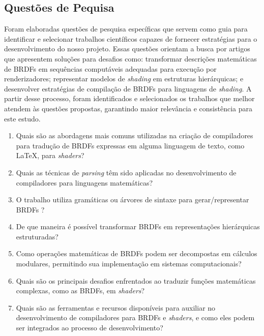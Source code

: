 %
%


%








\subsection{Questões de Pequisa}  \label{questoes-pesquisa}


Foram elaboradas questões de pesquisa específicas que servem como guia para identificar e selecionar trabalhos científicos capazes de fornecer estratégias para o desenvolvimento do nosso projeto. Essas questões orientam a busca por artigos que apresentem soluções para desafios como: transformar descrições matemáticas de BRDFs em sequências computáveis adequadas para execução por renderizadores; representar modelos de \textit{shading} em estruturas hierárquicas; e desenvolver estratégias de compilação de BRDFs para linguagens de \textit{shading}. A partir desse processo, foram identificados e selecionados os trabalhos que melhor atendem às questões propostas, garantindo maior relevância e consistência para este estudo.


\begin{enumerate}
  \item Quais são as abordagens mais comuns utilizadas na criação de compiladores para tradução de BRDFs expressas em alguma linguagem de texto, como \LaTeX{}, para \textit{shaders}?

  \item Quais as técnicas de \textit{parsing} têm sido aplicadas no desenvolvimento de compiladores para linguagens matemáticas?

  \item O trabalho utiliza gramáticas ou árvores de sintaxe para gerar/representar BRDFs ?

  \item De que maneira é possível transformar BRDFs em representações hierárquicas estruturadas?

  \item Como operações matemáticas de BRDFs podem ser decompostas em cálculos modulares, permitindo sua implementação em sistemas computacionais?

 \item Quais são os principais desafios enfrentados ao traduzir funções matemáticas complexas, como as BRDFs, em \textit{shaders}?

 \item Quais são as ferramentas e recursos disponíveis para auxiliar no desenvolvimento de compiladores para BRDFs e \textit{shaders}, e como eles podem ser integrados ao processo de desenvolvimento?

\end{enumerate}




